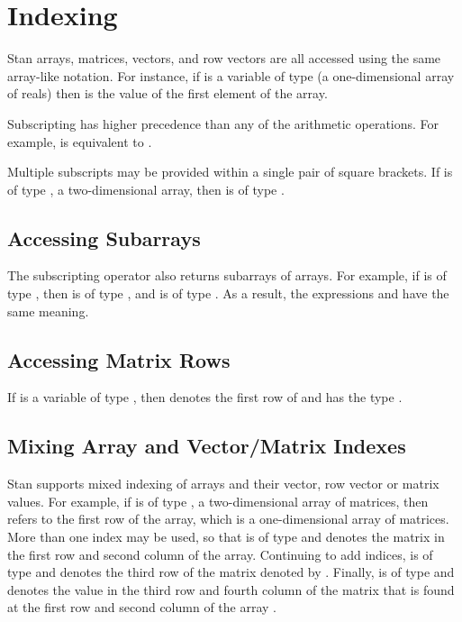 \section{Indexing}\label{language-indexing.section}

Stan arrays, matrices, vectors, and row vectors are all accessed
using the same array-like notation.  For instance, if  is a
variable of type  (a one-dimensional array of reals)
then  is the value of the first element of the
array.

Subscripting has higher precedence than any of the arithmetic
operations.  For example,  is equivalent to
.

Multiple subscripts may be provided within a single pair of square
brackets.  If  is of type , a two-dimensional
array, then  is of type .

\subsection{Accessing Subarrays}

The subscripting operator also returns subarrays of arrays.  For
example, if  is of type , then 
is of type , and  is of type
.  As a result, the expressions  and
 have the same meaning.

\subsection{Accessing Matrix Rows}

If  is a variable of type , then
 denotes the first row of  and has the
type .

\subsection{Mixing Array and Vector/Matrix Indexes}

Stan supports mixed indexing of arrays and their vector, row vector
or matrix values.  For example, if  is of type
, a two-dimensional array of matrices, then
 refers to the first row of the array, which is a
one-dimensional array of matrices.  More than one index may be used,
so that  is of type  and denotes the matrix
in the first row and second column of the array.  Continuing to add
indices,  is of type  and denotes
the third row of the matrix denoted by .  Finally,
 is of type  and denotes the value in the
third row and fourth column of the matrix that is found at the first
row and second column of the array .

